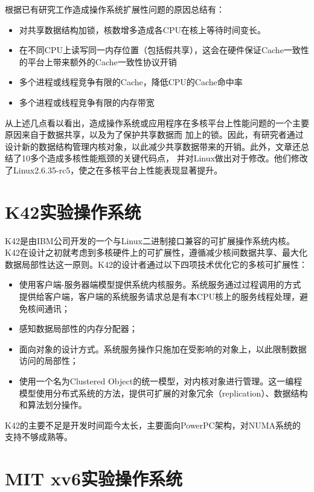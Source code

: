 根据已有研究工作造成操作系统扩展性问题的原因总结有：

\begin{itemize}
\item 对共享数据结构加锁，核数增多造成各CPU在核上等待时间变长。
\item 在不同CPU上读写同一内存位置（包括假共享），这会在硬件保证Cache一致性的平台上带来额外的Cache一致性协议开销
\item 多个进程或线程竞争有限的Cache，降低CPU的Cache命中率
\item 多个进程或线程竞争有限的内存带宽
\end{itemize}

从上述几点看以看出，造成操作系统或应用程序在多核平台上性能问题的一个主要原因来自于数据共享，以及为了保护共享数据而
加上的锁。因此，有研究者通过设计新的数据结构管理内核对象，以此减少共享数据带来的开销。此外，文章还总结了10多个造成多核性能瓶颈的关键代码点，
并对Linux做出对于修改。他们修改了Linux2.6.35-rc5，使之在多核平台上性能表现显著提升。

\section{K42实验操作系统}
K42\cite{Krieger:2006:KBC:1218063.1217949}是由IBM公司开发的一个与Linux二进制接口兼容的可扩展操作系统内核。K42在设计之初就考虑到多核硬件上的可扩展性，遵循减少核间数据共享、最大化数据局部性达这一原则。K42的设计者通过以下四项技术优化它的多核可扩展性：
\begin{itemize}
\item 使用客户端-服务器端模型提供系统内核服务。系统服务通过过程调用的方式提供给客户端，客户端的系统服务请求总是有本CPU核上的服务线程处理，避免核间通讯；
\item 感知数据局部性的内存分配器；
\item 面向对象的设计方式。系统服务操作只施加在受影响的对象上，以此限制数据访问的局部性；
\item 使用一个名为Clustered Object的统一模型，对内核对象进行管理。这一编程模型使用分布式系统的方法，提供可扩展的对象冗余（replication）、数据结构和算法划分操作。
\end{itemize}

K42的主要不足是开发时间距今太长，主要面向PowerPC架构，对NUMA系统的支持不够成熟等。

\section{MIT xv6实验操作系统}

